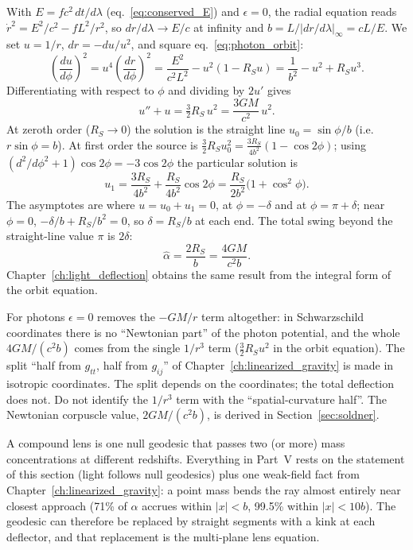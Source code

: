 \begin{derivation}[From eq.~\eqref{eq:photon_orbit} to $\hat\alpha = 4GM/(c^2b)$]
With $E = fc^2\,dt/d\lambda$ (eq.~\eqref{eq:conserved_E}) and
$\epsilon = 0$, the radial equation reads
$\dot r^2 = E^2/c^2 - fL^2/r^2$, so $dr/d\lambda \to E/c$ at infinity and $b = L/|dr/d\lambda|_\infty = cL/E$.
We set $u = 1/r$, $dr = -du/u^2$, and square eq.~\eqref{eq:photon_orbit}:
\[
\left(\frac{du}{d\phi}\right)^2 = u^4\left(\frac{dr}{d\phi}\right)^2
= \frac{E^2}{c^2L^2} - u^2(1 - R_Su)
= \frac{1}{b^2} - u^2 + R_Su^3 .
\]
Differentiating with respect to $\phi$ and dividing by $2u'$ gives
\[
u'' + u = \tfrac32R_S\,u^2 = \frac{3GM}{c^2}\,u^2 .
\]
At zeroth order ($R_S \to 0$) the solution is the straight line $u_0 = \sin\phi/b$
(i.e.\ $r\sin\phi = b$).  At first order the source is
$\tfrac32R_Su_0^2 = \tfrac{3R_S}{4b^2}(1 - \cos2\phi)$; using
$(d^2/d\phi^2 + 1)\cos2\phi = -3\cos2\phi$ the particular solution is
\[
u_1 = \frac{3R_S}{4b^2} + \frac{R_S}{4b^2}\cos2\phi
    = \frac{R_S}{2b^2}\bigl(1 + \cos^2\phi\bigr) .
\]
The asymptotes are where $u = u_0 + u_1 = 0$, at $\phi = -\delta$ and at
$\phi = \pi + \delta$; near $\phi = 0$,
$-\delta/b + R_S/b^2 = 0$, so $\delta = R_S/b$ at each end.  The total
swing beyond the straight-line value $\pi$ is $2\delta$:
\[
\hat\alpha = \frac{2R_S}{b} = \frac{4GM}{c^2b} .
\]
Chapter~\ref{ch:light_deflection} obtains the same result from the
integral form of the orbit equation.
\end{derivation}

\begin{annotation}
For photons $\epsilon = 0$ removes the $-GM/r$ term altogether: in
Schwarzschild coordinates there is no ``Newtonian part'' of the photon
potential, and the whole $4GM/(c^2b)$ comes from the single $1/r^3$ term
($\tfrac32R_Su^2$ in the orbit equation).  The split ``half from $g_{tt}$,
half from $g_{ij}$'' of Chapter~\ref{ch:linearized_gravity} is made in
isotropic coordinates.  The split depends on the coordinates; the total
deflection does not.  Do not identify the $1/r^3$ term with the
``spatial-curvature half''.  The Newtonian corpuscle value, $2GM/(c^2b)$, is
derived in Section~\ref{sec:soldner}.
\end{annotation}

\begin{bridge}
A compound lens is one null geodesic that passes two (or more) mass
concentrations at different redshifts.  Everything in Part~V rests on the
statement of this section (light follows null geodesics) plus one
weak-field fact from Chapter~\ref{ch:linearized_gravity}: a point mass bends the ray
almost entirely near closest approach (71\% of $\hat\alpha$ accrues within
$|x| < b$, 99.5\% within $|x| < 10b$).  The geodesic can therefore be
replaced by straight segments with a kink at each deflector, and that
replacement is the multi-plane lens equation.
\end{bridge}

